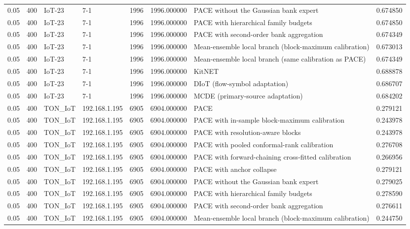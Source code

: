 \begin{tabular}{llllllll}
0.05 & 400 & IoT-23 & 7-1 & 1996 & 1996.000000 & PACE without the Gaussian bank expert & 0.674850 \\
0.05 & 400 & IoT-23 & 7-1 & 1996 & 1996.000000 & PACE with hierarchical family budgets & 0.674850 \\
0.05 & 400 & IoT-23 & 7-1 & 1996 & 1996.000000 & PACE with second-order bank aggregation & 0.674349 \\
0.05 & 400 & IoT-23 & 7-1 & 1996 & 1996.000000 & Mean-ensemble local branch (block-maximum calibration) & 0.673013 \\
0.05 & 400 & IoT-23 & 7-1 & 1996 & 1996.000000 & Mean-ensemble local branch (same calibration as PACE) & 0.674349 \\
0.05 & 400 & IoT-23 & 7-1 & 1996 & 1996.000000 & KitNET & 0.688878 \\
0.05 & 400 & IoT-23 & 7-1 & 1996 & 1996.000000 & DIoT (flow-symbol adaptation) & 0.686707 \\
0.05 & 400 & IoT-23 & 7-1 & 1996 & 1996.000000 & MCDE (primary-source adaptation) & 0.684202 \\
0.05 & 400 & TON\_IoT & 192.168.1.195 & 6905 & 6904.000000 & PACE & 0.279121 \\
0.05 & 400 & TON\_IoT & 192.168.1.195 & 6905 & 6904.000000 & PACE with in-sample block-maximum calibration & 0.243978 \\
0.05 & 400 & TON\_IoT & 192.168.1.195 & 6905 & 6904.000000 & PACE with resolution-aware blocks & 0.243978 \\
0.05 & 400 & TON\_IoT & 192.168.1.195 & 6905 & 6904.000000 & PACE with pooled conformal-rank calibration & 0.276708 \\
0.05 & 400 & TON\_IoT & 192.168.1.195 & 6905 & 6904.000000 & PACE with forward-chaining cross-fitted calibration & 0.266956 \\
0.05 & 400 & TON\_IoT & 192.168.1.195 & 6905 & 6904.000000 & PACE with anchor collapse & 0.279121 \\
0.05 & 400 & TON\_IoT & 192.168.1.195 & 6905 & 6904.000000 & PACE without the Gaussian bank expert & 0.279025 \\
0.05 & 400 & TON\_IoT & 192.168.1.195 & 6905 & 6904.000000 & PACE with hierarchical family budgets & 0.278590 \\
0.05 & 400 & TON\_IoT & 192.168.1.195 & 6905 & 6904.000000 & PACE with second-order bank aggregation & 0.276611 \\
0.05 & 400 & TON\_IoT & 192.168.1.195 & 6905 & 6904.000000 & Mean-ensemble local branch (block-maximum calibration) & 0.244750 \\

\end{tabular}
